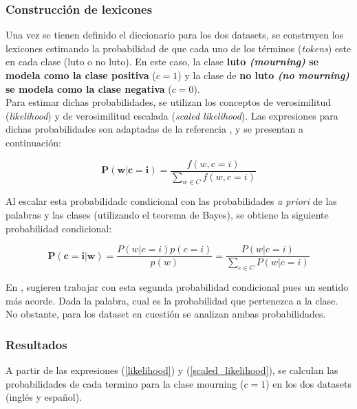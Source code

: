 \subsubsection{Construcción de lexicones}

Una vez se tienen definido el diccionario para los dos datasets, se construyen los lexicones estimando la probabilidad de que cada uno de los términos (\textit{tokens}) este en cada clase (luto o no luto). En este caso, la clase \textbf{luto \textit{(mourning)} se modela como la clase positiva} ($c = 1$) y la clase de \textbf{no luto \textit{(no mourning)} se modela como la clase negativa} ($c = 0$). \\

Para estimar dichas probabilidades, se utilizan los conceptos de verosimilitud  (\textit{likelihood}) y de verosimilitud escalada (\textit{scaled likelihood}). Las expresiones para dichas probabilidades son adaptadas de la referencia \cite{Potts2010SALT}, y se presentan a continuación:

\begin{equation}
    \mathbf{P(w|c=i)} = \frac{f(w,c=i)}{\sum_{w\in C} f(w,c=i)}
    \label{likelihood}
\end{equation} 

Al escalar esta probabilidadc condicional con las probabilidades \textit{a priori} de las palabras y las clases (utilizando el teorema de Bayes), se obtiene la siguiente probabilidad condicional:

\begin{equation}
    \mathbf{P(c=i|w)} = \frac{P(w|c=i) p(c=i)}{p(w)} = \frac{P(w|c=i)}{\sum_{c\in C} P(w|c=i)}
    \label{scaled_likelihood}
\end{equation} 

En \cite{Potts2010SALT}, sugieren trabajar con esta segunda probabilidad condicional pues un sentido más acorde. Dada la palabra, cual es la probabilidad que pertenezca a la clase. No obstante, para los dataset en cuestión se analizan ambas probabilidades.

\subsubsection{Resultados}
A partir de las expresiones (\ref{likelihood}) y (\ref{scaled_likelihood}), se calculan las probabilidades de cada termino para la clase mourning ($c=1$) en los dos datasets (inglés y español).


